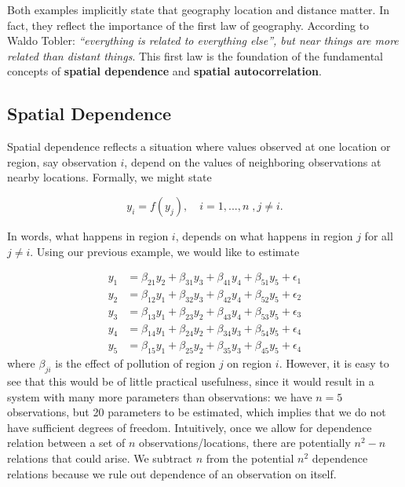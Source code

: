 Both examples implicitly state that geography location and distance matter. In fact, they reflect the importance of the first law of geography. According to Waldo Tobler: \emph{``everything is related to everything else'', but near things are more related than distant things}. This first law is the foundation of the fundamental concepts of \textbf{spatial dependence} and \textbf{spatial autocorrelation}.

\subsection{Spatial Dependence}\label{sec:spatial_dependence}

Spatial dependence reflects a situation where values observed at one location or region, say observation $i$, depend on the values of neighboring observations at nearby locations. Formally, we might state

\begin{equation*}
  y_i = f(y_j),\quad i = 1,...,n\;, j\neq i.
\end{equation*}

In words, what happens in region $i$, depends on what happens in region $j$ for all $j\neq i$. Using our previous example, we would like to estimate 

\begin{equation*}
  \begin{aligned}
y_1 & = \beta_{21} y_2 + \beta_{31} y_3 + \beta_{41} y_4 + \beta_{51} y_5 + \epsilon_1 \\
y_2 & = \beta_{12} y_1 + \beta_{32} y_3 + \beta_{42} y_4 + \beta_{52} y_5 + \epsilon_2 \\
y_3 & = \beta_{13} y_1 + \beta_{23} y_2 + \beta_{43} y_4 + \beta_{53} y_5 + \epsilon_3 \\
y_4 & = \beta_{14} y_1 + \beta_{24} y_2 + \beta_{34} y_3 + \beta_{54} y_5 + \epsilon_4 \\
y_5 & = \beta_{15} y_1 + \beta_{25} y_2 + \beta_{35} y_3 + \beta_{45} y_5 + \epsilon_4 
\end{aligned}
\end{equation*}
%
where $\beta_{ji}$ is the effect of pollution of region $j$ on region $i$. However, it is easy to see that  this would be of little practical usefulness, since it would result in a system with many more parameters than observations: we have $n = 5$ observations, but 20 parameters to be estimated, which implies that we do not have sufficient degrees of freedom. Intuitively, once we allow for dependence relation between a set of $n$ observations/locations, there are potentially $n^2-n$ relations that could arise. We subtract $n$ from the potential $n^2$ dependence relations because we rule out dependence of an observation on itself. 

